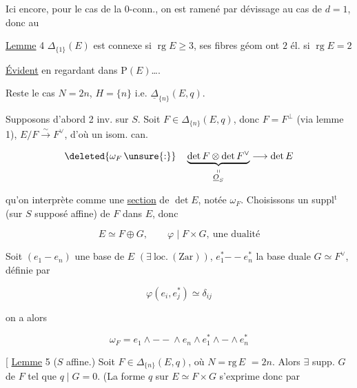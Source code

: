 Ici encore, pour le cas de la $0$-conn., on est ramené par dévissage au cas de $d=1$, donc  au 

\uline{Lemme} 4 $\Delta_{\{1\}}(E)$ est  connexe si $\operatorname{rg} E\geq3$, ses fibres géom ont $2$ él. si $\operatorname{rg} E=2$

\uline{Évident}  en regardant dans $\mathrm P(E)$\ldots.



Reste le cas $N=2n$,  $H=\{n\}$ i.e. $\underline{\Delta}_{\{n\}}(E,q)$.

  Supposons d'abord 2 inv. sur $S$. Soit $F\in\Delta_{\{n\}}(E,q)$,  donc $F=F^\perp$ (via lemme 1),  $E/F\xrightarrow{\sim}F^\vee$, d'où un isom. can.

\[
\deleted{\omega_F\,\unsure{:}}\quad
\underbrace{\det F\otimes\det F^\vee}_{\substack{\shortparallel\\ \underline{O}_S}}\longrightarrow\det E
\]

qu'on interprète comme une \uline{section} de $\det E$, notée $\omega_F$. Choisissons un suppl$^{\mathrm t}$  (sur $S$ supposé affine) de $F$ dans $E$, donc

\[
E\simeq F\oplus G,\qquad \varphi\mid F\times G,\ \text{une dualité}
\]

Soit $(e_1\mathbin{-}e_n)$ une base de $E$ $(\exists\ \mathrm{loc.}\ (\mathrm{Zar}))$, $e_1^*\mathbin{--}e_n^*$ la base duale $G\simeq F^\vee$, définie par

\[
\varphi(e_i,e_j^*)\simeq\delta_{ij}
\]

on a alors

\[
\omega_F=e_1\wedge\mathbin{--}\wedge e_n\wedge e_1^*\wedge\mathbin{-}\wedge e_n^*
\]


[ \uline{Lemme} 5 ($S$ affine.) Soit $F\in\Delta_{\{n\}}(E,q)$, où $N=\mathrm{rg}\,E$  $=2n$. Alors $\exists$ supp. $G$ de $F$ tel que $q\mid G=0$. (La forme $q$ sur $E\simeq F\times G$ s'exprime donc par

